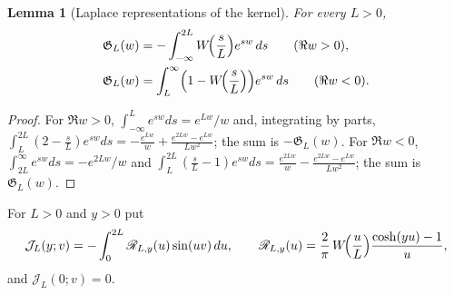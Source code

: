 \documentclass[11pt,a4paper]{article}
\numberwithin{equation}{section}
\newtheorem{lemma}[theorem]{Lemma}
\theoremstyle{definition}
\theoremstyle{remark}
\begin{document}
\begin{lemma}[Laplace representations of the kernel]\label{lem:taucw-laplace}
For every $L>0$,
\begin{align}
\mathfrak G_L(w)&=-\int_{-\infty}^{2L}W\!\Bigl(\frac sL\Bigr)e^{sw}\,ds\qquad(\Re w>0),\label{eq:taucw-lap+}\\
\mathfrak G_L(w)&=\int_{L}^{\infty}\Bigl(1-W\!\Bigl(\frac sL\Bigr)\Bigr)e^{sw}\,ds\qquad(\Re w<0).\label{eq:taucw-lap-}
\end{align}
\end{lemma}
\begin{proof}
For $\Re w>0$, $\int_{-\infty}^Le^{sw}ds=e^{Lw}/w$ and, integrating by parts, $\int_L^{2L}(2-\frac sL)e^{sw}ds=-\frac{e^{Lw}}w+\frac{e^{2Lw}-e^{Lw}}{Lw^2}$; the sum is $-\mathfrak G_L(w)$. For $\Re w<0$, $\int_{2L}^\infty e^{sw}ds=-e^{2Lw}/w$ and $\int_L^{2L}(\frac sL-1)e^{sw}ds=\frac{e^{2Lw}}w-\frac{e^{2Lw}-e^{Lw}}{Lw^2}$; the sum is $\mathfrak G_L(w)$.
\end{proof}

For $L>0$ and $y>0$ put
\begin{equation}\label{eq:taucw-J}
\mathcal J_L(y;v)=-\int_0^{2L}\mathscr R_{L,y}(u)\sin(uv)\,du,\qquad
\mathscr R_{L,y}(u)=\frac2\pi\,W\!\Bigl(\frac uL\Bigr)\frac{\cosh(yu)-1}{u},
\end{equation}
and $\mathcal J_L(0;v)=0$.
\end{document}
